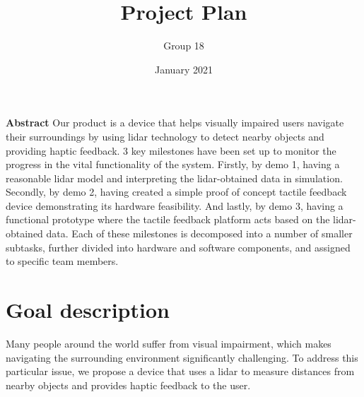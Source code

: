 \documentclass{article}
\title{Project Plan}
\author{Group 18}
\date{January 2021}
\begin{document}
\maketitle

\tableofcontents

\clearpage

\Large{\textbf{Abstract}}
\normalsize
\newline
Our product is a device that helps visually impaired users navigate their surroundings by using lidar technology to detect nearby objects and providing haptic feedback. 3 key milestones have been set up to monitor the progress in the vital functionality of the system. Firstly, by demo 1, having a reasonable lidar model and interpreting the lidar-obtained data in simulation. Secondly, by demo 2, having created a simple proof of concept tactile feedback device demonstrating its hardware feasibility. And lastly, by demo 3, having a functional prototype where the tactile feedback platform acts based on the lidar-obtained data. Each of these milestones is decomposed into a number of smaller subtasks, further divided into hardware and software components, and assigned to specific team members.
\section{Goal description}
Many people around the world suffer from visual impairment, which makes navigating the surrounding environment significantly challenging. To address this particular issue, we propose a device that uses a lidar to measure distances from nearby objects and provides haptic feedback to the user.
\end{document}

